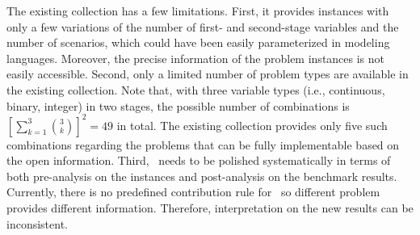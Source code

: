 The existing collection has a few limitations. 
First, it provides instances with only a few variations of the number of first- and second-stage variables and the number of scenarios, which could have been easily parameterized in 
modeling languages. Moreover, the precise information of the problem instances is 
not easily accessible. Second, only a limited number of problem types are available in 
the existing collection. Note that, with three variable types (i.e., continuous, 
binary, integer) in two stages, the possible number of combinations is $\left[\sum_{k=1}
^3\binom{3}{k}\right]^2=49$ in total. 
The existing collection provides only five such combinations 
regarding the problems that can be fully implementable based on the open information.
Third, \siplib\ needs to be polished systematically in terms of both pre-analysis on the 
instances and post-analysis on the benchmark results. Currently, there is no predefined 
contribution rule for \siplib\ so different problem provides different information. 
Therefore, interpretation on the new results can be inconsistent.



